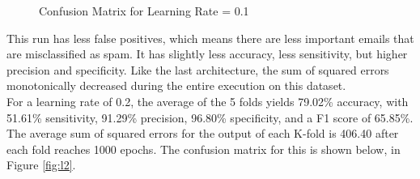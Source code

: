 \documentclass[tikz]{article}
\begin{document}
\begin{figure}[H]
\begin{center}
\caption{Confusion Matrix for Learning Rate = 0.1}
\label{fig:l1}
\end{center}
\end{figure}

This run has less false positives, which means there are less important emails that are misclassified as spam. It has slightly less accuracy, less sensitivity, but higher precision and specificity. Like the last architecture, the sum of squared errors monotonically decreased during the entire execution on this dataset. \\

For a learning rate of 0.2, the average of the 5 folds yields 79.02\% accuracy, with 51.61\% sensitivity, 91.29\% precision, 96.80\% specificity, and a F1 score of 65.85\%. The average sum of squared errors for the output of each K-fold is 406.40 after each fold reaches 1000 epochs. The confusion matrix for this is shown below, in Figure \ref{fig:l2}.
\end{document}
